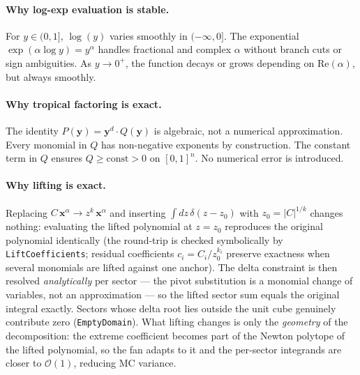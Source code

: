 \documentclass[11pt,a4paper]{article}
\begin{document}
\paragraph{Why log-exp evaluation is stable.}
For $y \in (0, 1]$, $\log(y)$ varies smoothly in $(-\infty, 0]$. The exponential $\exp(\alpha \log y) = y^\alpha$ handles fractional and complex $\alpha$ without branch cuts or sign ambiguities. As $y \to 0^+$, the function decays or grows depending on $\mathrm{Re}(\alpha)$, but always smoothly.

\paragraph{Why tropical factoring is exact.}
The identity $P(\mathbf{y}) = \mathbf{y}^d \cdot Q(\mathbf{y})$ is algebraic, not a numerical approximation. Every monomial in $Q$ has non-negative exponents by construction. The constant term in $Q$ ensures $Q \geq \text{const} > 0$ on $[0,1]^n$. No numerical error is introduced.

\paragraph{Why lifting is exact.}
Replacing $C\,\mathbf{x}^\alpha \to z^k\,\mathbf{x}^\alpha$ and inserting $\int dz\,\delta(z - z_0)$ with $z_0 = |C|^{1/k}$ changes nothing: evaluating the lifted polynomial at $z = z_0$ reproduces the original polynomial identically (the round-trip is checked symbolically by \texttt{LiftCoefficients}; residual coefficients $c_i = C_i/z_0^{k_i}$ preserve exactness when several monomials are lifted against one anchor). The delta constraint is then resolved \emph{analytically} per sector --- the pivot substitution is a monomial change of variables, not an approximation --- so the lifted sector sum equals the original integral exactly. Sectors whose delta root lies outside the unit cube genuinely contribute zero (\texttt{EmptyDomain}). What lifting changes is only the \emph{geometry} of the decomposition: the extreme coefficient becomes part of the Newton polytope of the lifted polynomial, so the fan adapts to it and the per-sector integrands are closer to $\mathcal{O}(1)$, reducing MC variance.
\end{document}
